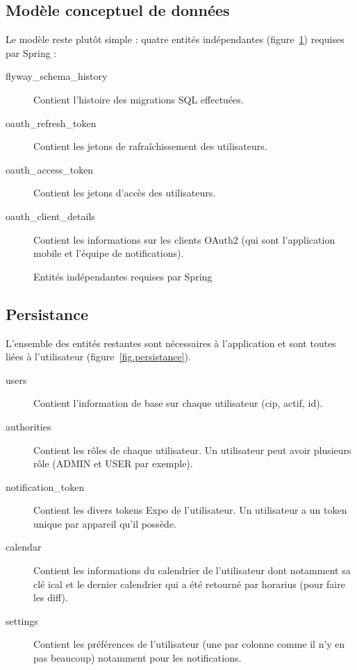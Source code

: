     \subsection{Modèle conceptuel de données}
    \noindent Le modèle reste plutôt simple : quatre entités indépendantes (figure~\ref{fig.entitesRequises}) requises par Spring :
    \begin{description}
        \item[flyway\_schema\_history] Contient l'histoire des migrations SQL effectuées.
        \item[oauth\_refresh\_token] Contient les jetons de rafraîchissement des utilisateurs.
        \item[oauth\_access\_token] Contient les jetons d'accès des utilisateurs.
        \item[oauth\_client\_details] Contient les informations sur les clients OAuth2 (qui sont l'application mobile et l'équipe de notifications).
    \end{description}
    
    \begin{figure}[p] \centering
        
        \caption{Entités indépendantes requises par Spring}
        \label{fig.entitesRequises}
    \end{figure}
    
    \subsection{Persistance}
    \noindent L'ensemble des entités restantes sont nécessaires à l'application et sont toutes liées à l'utilisateur (figure~\ref{fig.persistance}).
    \begin{description}
        \item[users] Contient l'information de base sur chaque utilisateur (cip, actif, id).
        \item[authorities] Contient les rôles de chaque utilisateur. Un utilisateur peut avoir plusieurs rôle (ADMIN et USER par exemple).
        \item[notification\_token] Contient les divers tokens Expo de l'utilisateur. Un utilisateur a un token unique par appareil qu'il possède.
        \item[calendar] Contient les informations du calendrier de l'utilisateur dont notamment sa clé ical et le dernier calendrier qui a été retourné par horarius (pour faire les diff).
        \item[settings] Contient les préférences de l'utilisateur (une par colonne comme il n'y en pas beaucoup) notamment pour les notifications.
    \end{description}

